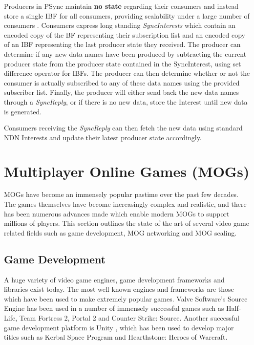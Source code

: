 Producers in PSync maintain \textbf{no state} regarding their consumers and instead store a single IBF for all consumers, providing scalability under a large number of consumers \cite{psync}. Consumers express long standing \textit{SyncInterests} which contain an encoded copy of the BF representing their subscription list and an encoded copy of an IBF representing the last producer state they received. The producer can determine if any new data names have been produced by subtracting the current producer state from the producer state contained in the SyncInterest, using set difference operator for IBFs. The producer can then determine whether or not the consumer is actually subscribed to any of these data names using the provided subscriber list. Finally, the producer will either send back the new data names through a \textit{SyncReply}, or if there is no new data, store the Interest until new data is generated.

Consumers receiving the \textit{SyncReply} can then fetch the new data using standard NDN Interests and update their latest producer state accordingly. 







\section{Multiplayer Online Games (MOGs)}\label{sec:mogs}
MOGs have become an immensely popular pastime over the past few decades. The games themselves have become increasingly complex and realistic, and there has been numerous advances made which enable modern MOGs to support millions of players. This section outlines the state of the art of several video game related fields such as game development, MOG networking and MOG scaling.   

\subsection{Game Development}
A huge variety of video game engines, game development frameworks and libraries exist today. The most well known engines and frameworks are those which have been used to make extremely popular games. Valve Software's Source Engine \cite{source-networking} has been used in a number of immensely successful games such as Half-Life, Team Fortress 2, Portal 2 and Counter Strike: Source. Another successful game development platform is Unity \cite{unity}, which has been used to develop major titles such as Kerbal Space Program and Hearthstone: Heroes of Warcraft.

